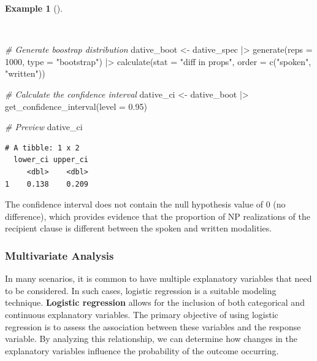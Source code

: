 \documentclass[
  letterpaper,
  krantz1]{latex/krantz-mod}
\newenvironment{Shaded}{\begin{snugshade}}{\end{snugshade}}
\newcommand{\AttributeTok}[1]{\textcolor[rgb]{0.00,0.00,0.00}{#1}}
\newcommand{\CommentTok}[1]{\textcolor[rgb]{0.00,0.00,0.00}{\textit{#1}}}
\newcommand{\DecValTok}[1]{\textcolor[rgb]{0.00,0.00,0.00}{#1}}
\newcommand{\FloatTok}[1]{\textcolor[rgb]{0.00,0.00,0.00}{#1}}
\newcommand{\FunctionTok}[1]{\textcolor[rgb]{0.00,0.00,0.00}{#1}}
\newcommand{\NormalTok}[1]{\textcolor[rgb]{0.00,0.00,0.00}{#1}}
\newcommand{\OtherTok}[1]{\textcolor[rgb]{0.00,0.00,0.00}{#1}}
\newcommand{\SpecialCharTok}[1]{\textcolor[rgb]{0.00,0.00,0.00}{#1}}
\newcommand{\StringTok}[1]{\textcolor[rgb]{0.00,0.00,0.00}{#1}}
\theoremstyle{definition}
\newtheorem{example}{Example}[chapter]
\theoremstyle{definition}
\theoremstyle{remark}
\begin{document}
\begin{example}[]\protect\hypertarget{exm-infer-cat-confidence-interval-bivariate}{}\label{exm-infer-cat-confidence-interval-bivariate}

~

\begin{Shaded}
\begin{Highlighting}[numbers=left,,]
\CommentTok{\# Generate boostrap distribution}
\NormalTok{dative\_boot }\OtherTok{\textless{}{-}}
\NormalTok{  dative\_spec }\SpecialCharTok{|\textgreater{}}
  \FunctionTok{generate}\NormalTok{(}\AttributeTok{reps =} \DecValTok{1000}\NormalTok{, }\AttributeTok{type =} \StringTok{"bootstrap"}\NormalTok{) }\SpecialCharTok{|\textgreater{}}
  \FunctionTok{calculate}\NormalTok{(}\AttributeTok{stat =} \StringTok{"diff in props"}\NormalTok{, }\AttributeTok{order =} \FunctionTok{c}\NormalTok{(}\StringTok{"spoken"}\NormalTok{, }\StringTok{"written"}\NormalTok{))}

\CommentTok{\# Calculate the confidence interval}
\NormalTok{dative\_ci }\OtherTok{\textless{}{-}}
\NormalTok{  dative\_boot }\SpecialCharTok{|\textgreater{}}
  \FunctionTok{get\_confidence\_interval}\NormalTok{(}\AttributeTok{level =} \FloatTok{0.95}\NormalTok{)}

\CommentTok{\# Preview}
\NormalTok{dative\_ci}
\end{Highlighting}
\end{Shaded}

\begin{verbatim}
# A tibble: 1 x 2
  lower_ci upper_ci
     <dbl>    <dbl>
1    0.138    0.209
\end{verbatim}

\end{example}

The confidence interval does not contain the null hypothesis value of 0
(no difference), which provides evidence that the proportion of NP
realizations of the recipient clause is different between the spoken and
written modalities.

\subsubsection{Multivariate Analysis}\label{multivariate-analysis}

In many scenarios, it is common to have multiple explanatory variables
that need to be considered. In such cases, logistic regression is a
suitable modeling technique. \textbf{Logistic regression} allows for the
inclusion of both categorical and continuous explanatory variables. The
primary objective of using logistic regression is to assess the
association between these variables and the response variable. By
analyzing this relationship, we can determine how changes in the
explanatory variables influence the probability of the outcome
occurring.
\end{document}

